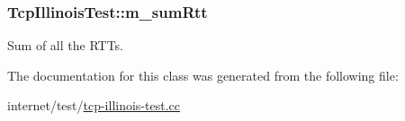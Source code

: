 \subsubsection[{\texorpdfstring{m\+\_\+sum\+Rtt}{m_sumRtt}}]{ Tcp\+Illinois\+Test\+::m\+\_\+sum\+Rtt\hspace{0.3cm}{\ttfamily [private]}}\hypertarget{classTcpIllinoisTest_ab05f6b6fa96ddefb75396ebc6a2015de}{}\label{classTcpIllinoisTest_ab05f6b6fa96ddefb75396ebc6a2015de}


Sum of all the R\+T\+Ts. 



The documentation for this class was generated from the following file\+:\begin{DoxyCompactItemize}
\item 
internet/test/\hyperlink{tcp-illinois-test_8cc}{tcp-\/illinois-\/test.\+cc}\end{DoxyCompactItemize}
